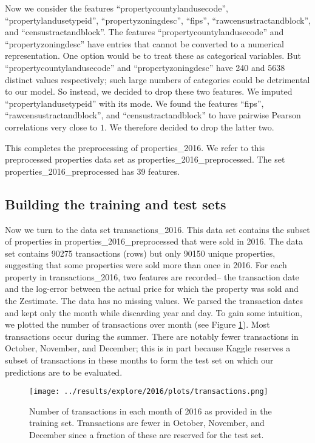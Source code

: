 \documentclass[12pt]{article}
\begin{document}
Now we consider the features ``propertycountylandusecode'', ``propertylandusetypeid'', ``propertyzoningdesc'', ``fips'', ``rawcensustractandblock'', and ``censustractandblock''. The features ``propertycountylandusecode'' and ``propertyzoningdesc'' have entries that cannot be converted to a numerical representation. One option would be to treat these as categorical variables. But ``propertycountylandusecode'' and ``propertyzoningdesc'' have 240 and 5638 distinct values respectively; such large numbers of categories could be detrimental to our model. So instead, we decided to drop these two features. We imputed ``propertylandusetypeid'' with its mode. We found the features ``fips'', ``rawcensustractandblock'', and ``censustractandblock'' to have pairwise Pearson correlations very close to $1$. We therefore decided to drop the latter two.

This completes the preprocessing of properties\_2016. We refer to this preprocessed properties data set as properties\_2016\_preprocessed. The set properties\_2016\_preprocessed has 39 features.

\subsection{Building the training and test sets}

Now we turn to the data set transactions\_2016. This data set contains the subset of properties in properties\_2016\_preprocessed that were sold in 2016. The data set contains 90275 transactions (rows) but only 90150 unique properties, suggesting that some properties were sold more than once in 2016. For each property in transactions\_2016, two features are recorded-- the transaction date and the log-error between the actual price for which the property was sold and the Zestimate. The data has no missing values. We parsed the transaction dates and kept only the month while discarding year and day. To gain some intuition, we plotted the number of transactions over month (see Figure \ref{fig-month}). Most transactions occur during the summer. There are notably fewer transactions in October, November, and December; this is in part because Kaggle reserves a subset of transactions in these months to form the test set on which our predictions are to be evaluated.

\begin{figure}
\centering
\texttt{[image: ../results/explore/2016/plots/transactions.png]}
\caption{\label{fig-month} Number of transactions in each month of 2016 as provided in the training set. Transactions are fewer in October, November, and December since a fraction of these are reserved for the test set.}
\end{figure}
\end{document}
